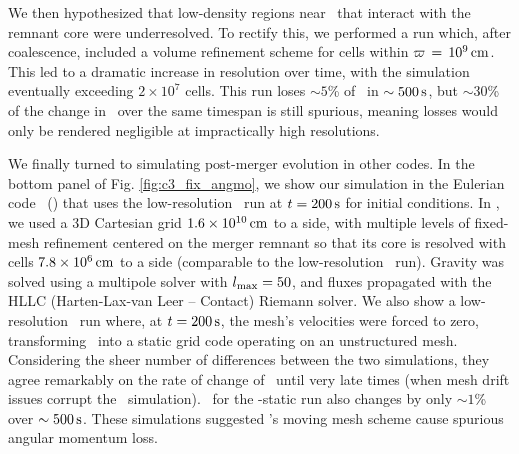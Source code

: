 
We then hypothesized that low-density regions near \innercyl\ that interact with the remnant core were underresolved. To rectify this, we performed a run which, after coalescence, included a volume refinement scheme for cells within $\varpi\,=\,10^9\,\mathrm{cm}$.  This led to a dramatic increase in resolution over time, with the simulation eventually exceeding $2\times10^7$ cells.  This run loses $\sim5$\% of \Lztot\ in $\sim500\,\mathrm{s}$, but $\sim30$\% of the change in \Lzinner\ over the same timespan is still spurious, meaning losses would only be rendered negligible at impractically high resolutions.




We finally turned to simulating post-merger evolution in other codes.  In the bottom panel of Fig. \ref{fig:c3_fix_angmo}, we show our simulation in the Eulerian code \flash\ (\citealt{fryx+00, dube+09}) that uses the low-resolution \arepo\ run at $t = 200\,\mathrm{s}$ for initial conditions.  In \flash, we used a 3D Cartesian grid $1.6\times10^{10}\,\mathrm{cm}$ to a side, with multiple levels of fixed-mesh refinement centered on the merger remnant so that its core is resolved with cells $7.8\times10^6\,\mathrm{cm}$ to a side (comparable to the low-resolution \arepo\ run).  Gravity was solved using a multipole solver with $l_\mathrm{max} = 50$, and fluxes propagated with the HLLC (Harten-Lax-van Leer -- Contact) Riemann solver.  We also show a low-resolution \arepo\ run where, at $t = 200\,\mathrm{s}$, the mesh's velocities were forced to zero, transforming \arepo\ into a static grid code operating on an unstructured mesh.  Considering the sheer number of differences between the two simulations, they agree remarkably on the rate of change of \Lzinner\ until very late times (when mesh drift issues corrupt the \arepo\ simulation).  \Lztot\ for the \arepo-static run also changes by only $\sim1$\% over $\sim500\,\mathrm{s}$.  These simulations suggested \arepo's moving mesh scheme cause spurious angular momentum loss.

